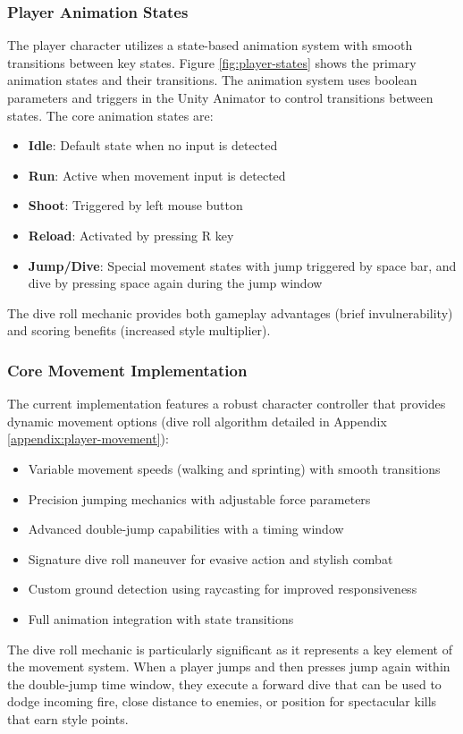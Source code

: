 \documentclass{article}
\begin{document}
    \subsubsection{Player Animation States}
    The player character utilizes a state-based animation system with smooth transitions between key states. Figure \ref{fig:player-states} shows the primary animation states and their transitions.
    The animation system uses boolean parameters and triggers in the Unity Animator to control transitions between states. The core animation states are:
    \begin{itemize}
        \item \textbf{Idle}: Default state when no input is detected
        \item \textbf{Run}: Active when movement input is detected
        \item \textbf{Shoot}: Triggered by left mouse button
        \item \textbf{Reload}: Activated by pressing R key
        \item \textbf{Jump/Dive}: Special movement states with jump triggered by space bar, and dive by pressing space again during the jump window
    \end{itemize}
    The dive roll mechanic provides both gameplay advantages (brief invulnerability) and scoring benefits (increased style multiplier).

    \subsubsection{Core Movement Implementation}
    The current implementation features a robust character controller that provides dynamic movement options (dive roll algorithm detailed in Appendix \ref{appendix:player-movement}):
    \begin{itemize}
        \item Variable movement speeds (walking and sprinting) with smooth transitions
        \item Precision jumping mechanics with adjustable force parameters
        \item Advanced double-jump capabilities with a timing window
        \item Signature dive roll maneuver for evasive action and stylish combat
        \item Custom ground detection using raycasting for improved responsiveness
        \item Full animation integration with state transitions
    \end{itemize}
    The dive roll mechanic is particularly significant as it represents a key element of the movement system. When a player jumps and then presses jump again within the double-jump time window, they execute a forward dive that can be used to dodge incoming fire, close distance to enemies, or position for spectacular kills that earn style points.
\end{document}
